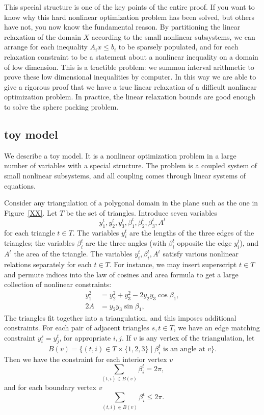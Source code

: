 This special structure is one of the key points of the entire proof.
If you want to know why this hard nonlinear optimization problem has
been solved, but others have not, you now know the fundamental reason.
By partitioning the linear relaxation of the domain $X$ according
to the small nonlinear subsystems, we can arrange for each inequality
$A_i x\le b_i$ to be sparsely populated, and for each relaxation
constraint to be a statement about a nonlinear inequality on a domain
of low dimension.  This is a tractible problem:
we  summon interval arithmetic to prove these
low dimensional inequalities by computer.  In this way we are able
to give a rigorous proof that we have a true linear relaxation of a
difficult nonlinear optimization problem.  In practice, the linear
relaxation  bounds  are good enough to solve the sphere packing
problem.

\subsection{toy model}

We describe a toy model.  It is a nonlinear optimization problem in a large
number of variables with a special structure.  The problem is a coupled
system of small nonlinear subsystems, and all coupling comes through linear
systems of equations.

Consider any triangulation of a polygonal domain in the plane such as the one
in Figure~\ref{XX}. %
Let $T$ be the set of triangles.  Introduce seven variables 
  $$y^t_1,y^t_2,y^t_3,\beta_1^t,\beta_2^t,\beta_3^t,A^t$$
for each triangle $t\in T$.  The variables $y_i^t$ are the lengths of the three
edges of the triangles; the variables $\beta_i^t$ are the three angles (with
$\beta_i^t$ opposite the edge $y_i^t$), and $A^t$ the area of the triangle.
The variables $y_i^t,\beta_i^t,A^t$ satisfy various nonlinear relations separately for each $t\in T$.
For instance, we may insert superscript $t\in T$ and permute indices into the 
law of cosines and area formula to get a large collection of nonlinear constraints:
   \begin{equation}\label{eqn:loc}
   \begin{array}{lll}
   y_1^2 &= y_2^2 + y_3^2 - 2 y_2 y_3 \cos\beta_1,\\
   2 A &= y_2 y_3 \sin\beta_1,
   \end{array}
   \end{equation}
The triangles fit together into a triangulation, and this imposes additional constraints.
For each pair of adjacent triangles $s,t\in T$, we have an edge matching constraint
$y^s_i = y^t_j$, for appropriate $i,j$.  If $v$ is any vertex of the triangulation, let
   $$
   B(v) = \{(t,i)\in T\times \{1,2,3\} \mid \beta^t_i \text{ is an angle at } v \}.
   $$
Then we have the constraint for each interior vertex $v$
   \begin{equation}\label{eqn:toy1}
   \sum_{(t,i)\in B(v)} \beta^t_i = 2\pi,
   \end{equation}
and for each boundary vertex $v$
   \begin{equation}\label{eqn:toy2}
   \sum_{(t,i)\in B(v)}\beta^t_i \le 2\pi.
   \end{equation}

